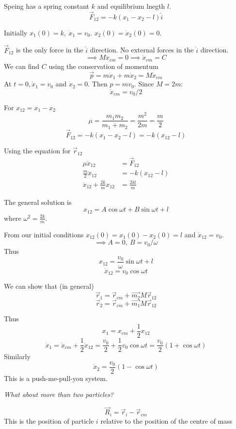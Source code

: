 \begin{example}[Spring]
\vspace*{50pt}

Speing has a spring constant $k$ and equilibrium lnegth $l$. 
\[\vec{F}_{12} = -k(x_1 - x_2 - l)\hat{i}\]

Initially $x_1(0) = k,~ \dot{x}_1 = v_0$. $x_2(0) = \dot{x}_2(0) = 0$.

$\vec{F}_{12}$ is the only force in the $\hat{i}$ direction. No external forces in the $\hat{i}$ direction. 
\[\implies M\ddot{x}_{cm} = 0 \implies \dot{x}_{cm} = C\]
We can find $C$ using the conservation of momentum
\[\vec{p} = m\dot{x}_1 + m\dot{x}_2 = M\dot{x}_{cm}\]
At $t = 0, \dot{x}_1 = v_0$ and $\dot{x}_2 = 0$. Then $p = mv_0$. Since $M = 2m$:
\[\dot{x}_{cm} = v_0/2\]

For $x_{12} = x_1 - x_2$
\[\mu = \frac{m_1m_2}{m_1 + m_2} = \frac{m^2}{2m} = \frac{m}{2}\]
\[\vec{F}_{12} = -k(x_1 - x_2 - l) = -k(x_{12} - l)\]

Using the equation for $\vec{r}_{12}$
\[\begin{aligned}\mu\ddot{x}_{12} &= \vec{F}_{12}\\
\frac{m}{2}\ddot{x}_{12} &= -k(x_{12} - l)\\
\ddot{x}_{12} + \frac{2k}{m}x_{12} &= \frac{2kl}{m}	
\end{aligned}
\]

The general solution is 
\[x_{12} = A\cos\omega t + B\sin\omega t + l\]
where $\omega^2 = \frac{2k}{m}$. 

From our initial conditions $x_{12}(0) = x_1(0) - x_2(0) = l$ and $\dot{x}_{12} = v_0$. 
\[\implies A = 0,~B = v_0/\omega\]Thus
\[x_{12} = \frac{v_0}{\omega}\sin\omega t + l\]
\[\dot{x}_{12} = v_0\cos\omega t\]

We can show that (in general)
\[\vec{r}_1 = \vec{r}_{cm} + \vec{m_2}{M}\vec{r}_{12}\]
\[\vec{r}_2 = \vec{r}_{cm} + \vec{m_1}{M}\vec{r}_{12}\]

Thus
\[x_1 = x_{cm} + \frac{1}{2}x_{12}\]
\[\dot{x}_1 = \dot{x}_{cm} + \frac{1}{2}\dot{x}_{12} = \frac{v_0}{2} + \frac{1}{2}v_0\cos\omega t = \frac{v_0}{2}(1+\cos\omega t)\]
Similarly 
\[\dot{x}_2 =  \frac{v_0}{2}(1 - \cos\omega t)\]
This is a push-me-pull-you system.
\end{example}

\emph{What about more than two particles?}\\

\begin{definition}
\[\vec{R}_i = \vec{r}_i - \vec{r}_{cm}\]	
This is the position of particle $i$ relative to the position of the centre of mass
\end{definition}

